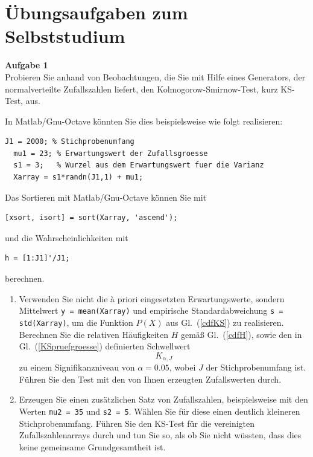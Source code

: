 %
%
%
%

\section{Übungsaufgaben zum Selbststudium}
\label{AufgVorl5}

\textbf{Aufgabe 1}\\

Probieren Sie anhand von Beobachtungen, die Sie mit Hilfe eines Generators, der
normalverteilte Zufallszahlen liefert, den Kolmogorow-Smirnow-Test, kurz KS-Test, aus.

In Matlab/Gnu-Octave könnten Sie dies beispielsweise wie folgt realisieren:

\begin{lstlisting}[style=Matlab]
  J1 = 2000; % Stichprobenumfang
  mu1 = 23; % Erwartungswert der Zufallsgroesse
  s1 = 3;   % Wurzel aus dem Erwartungswert fuer die Varianz
  Xarray = s1*randn(J1,1) + mu1;
\end{lstlisting}
Das Sortieren mit Matlab/Gnu-Octave können Sie mit
\begin{lstlisting}[style=Matlab]
  [xsort, isort] = sort(Xarray, 'ascend');
\end{lstlisting}
und die Wahrscheinlichkeiten mit
\begin{lstlisting}[style=Matlab]
  h = [1:J1]'/J1;
\end{lstlisting}
berechnen.

\begin{enumerate}
\item Verwenden Sie nicht die {\`a} priori eingesetzten Erwartungswerte,
 sondern Mittelwert \texttt{y = mean(Xarray)} und empirische Standardabweichung
 \texttt{s = std(Xarray)}, um die Funktion $P(X)$ aus Gl.~(\ref{cdfKS})
 zu realisieren. Berechnen Sie die relativen Häufigkeiten $H$ gemäß
 Gl.~(\ref{cdfH}), sowie den in Gl.~(\ref{KSpruefgroesse}) definierten
 Schwellwert
  $$K_{\alpha, J}$$
 zu einem Signifikanzniveau von $\alpha = 0.05$,
 wobei $J$ der Stichprobenumfang ist.
 Führen Sie den Test mit den von Ihnen erzeugten Zufallswerten durch.
\item Erzeugen Sie einen zusätzlichen Satz von Zufallszahlen, beispielsweise mit den
 Werten \texttt{mu2 = 35} und \texttt{s2 = 5}. Wählen Sie für diese einen
 deutlich kleineren Stichprobenumfang. Führen Sie den KS-Test für die
 vereinigten Zufallszahlenarrays durch und tun Sie so, als ob Sie nicht
 wüssten, dass dies keine gemeinsame Grundgesamtheit ist.
\end{enumerate}



